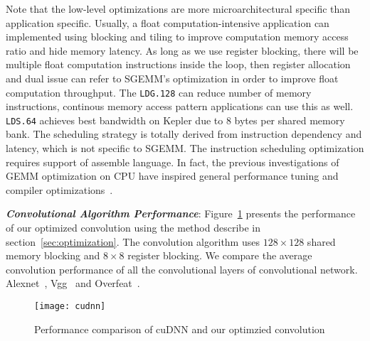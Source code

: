 Note that the low-level optimizations are more microarchitectural specific than application specific. 
Usually, a float computation-intensive application can implemented using
blocking and tiling to improve computation memory access ratio and hide memory latency. As long as we use
register blocking, there will be multiple float computation instructions inside
the loop, then register allocation and dual issue can refer to SGEMM's
optimization in order to improve float computation throughput. 
The {\tt LDG.128} can reduce number of memory instructions, continous memory
access pattern applications can use this as well.
{\tt LDS.64} achieves best bandwidth on Kepler due to 8 bytes per shared memory bank. 
The scheduling strategy is totally derived from instruction dependency and latency,
which is not specific to SGEMM. 
The instruction scheduling optimization requires support of assemble language.
In fact, the previous investigations of GEMM optimization on CPU have inspired
general performance tuning and compiler optimizations~\cite{lam1991cache}.  

{\em {\bf Convolutional Algorithm Performance}}:
Figure~\ref{fig:conv} presents the performance of our optimized convolution using the method describe in section~\ref{sec:optimization}.
The convolution algorithm uses $128\times128$ shared memory blocking and $8\times8$ register blocking. We compare the average convolution performance of all the convolutional layers of convolutional network. 
Alexnet~\cite{krizhevsky2012imagenet}, Vgg~\cite{simonyan2014very} and Overfeat~\cite{sermanet2013overfeat}.

\begin{figure}[htbp]
\begin{center}
\texttt{[image: cudnn]}
\caption{Performance comparison of cuDNN and our optimzied convolution}
\label{fig:conv}
\end{center}
\end{figure}
